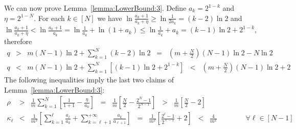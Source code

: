 \documentclass[final,12pt]{colt2018}
\begin{document}
We can now prove Lemma~\ref{lemma:LowerBound:3}. Define
$
a_k=2^{1-k}$ and $\eta=2^{1-N}
$.
For each $k\in[N]$ we have $\ln\frac{a_k+1}{a_k+\eta}\ge \ln\frac{1}{2a_k} = (k-2)\ln 2$ and
 $\ln\frac{a_k+1}{a_k+\eta}<\ln\frac{a_k+1}{a_k} = \ln \frac{1}{a_k} + \ln (1+a_k) \le \ln \frac{1}{a_k} + a_k=(k-1)\ln 2+2^{1-k}$,
therefore
\begin{eqnarray*}
 q&>& m(N-1)\ln 2 + \sum_{k=1}^N (k-2)\ln 2 \;\;=\;\;  \left(m+\frac{N}{2}\right)(N-1)\ln 2 - N\ln 2 \\
 q&<& m(N-1)\ln 2 + \sum_{k=1}^N \left[  (k-1)\ln 2+2^{1-k} \right] \;\;<\;\; \left(m+\frac{N}{2}\right)(N-1)\ln 2 + 2 
\end{eqnarray*}
The following inequalities imply the last two claims of Lemma~\ref{lemma:LowerBound:3}:
\begin{eqnarray*}
\rho&>&\frac{1}{m}\sum_{k=1}^N\left[\frac{1}{1+1}-\frac{\eta}{a_k}\right]
\;\;=\;\;\frac{1}{m}\left[\frac{N}2-\frac{2^N-1}{2^{N-1}}\right]
\;\;>\;\; \frac{1}{m}\left[\frac{N}2-2\right]
\\
\kappa_\ell&<&
\frac{1}{m^2}\left[\sum_{k=1}^\ell\frac{a_\ell}{a_k}+
\sum_{k=\ell+1}^{+\infty} \frac{a_k}{a_{\ell+1}}\right]
\;\;=\;\;\frac{1}{m^2}\left[\frac{2^\ell-1}{2^{\ell-1}}+2\right]
\;\;<\;\; \frac{4}{m^2}\qquad\qquad \forall \ell\in[N-1]
\end{eqnarray*}









\end{document}
